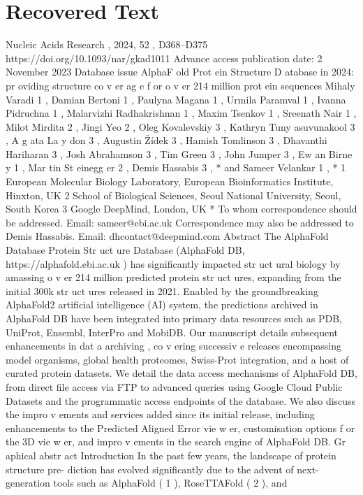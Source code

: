 \section{Recovered Text}
Nucleic Acids Research , 2024, 52 , D368–D375
https://doi.org/10.1093/nar/gkad1011
Advance access publication date: 2 November 2023
Database issue
AlphaF old Prot ein Structure D atabase in 2024: pr oviding
structure co v er ag e f or o v er 214 million prot ein sequences
Mihaly Varadi
1 , Damian Bertoni 1 , Paulyna Magana 1 , Urmila Paramval 1 , Ivanna Pidruchna 1 ,
Malarvizhi Radhakrishnan 1 , Maxim Tsenkov 1 , Sreenath Nair 1 , Milot Mirdita 2 , Jingi Yeo 2 ,
Oleg Kovalevskiy 3 , Kathryn Tuny asuvunakool 3 , A g ata La y don 3 , Augustin Žídek 3 ,
Hamish Tomlinson 3 , Dhavanthi Hariharan 3 , Josh Abrahamson 3 , Tim Green 3 , John Jumper 3 ,
Ew an Birne y
1 , Mar tin St einegg er 2 , Demis Hassabis 3 , * and Sameer Velankar
1 , *
1 European Molecular Biology Laboratory, European Bioinformatics Institute, Hinxton, UK
2 School of Biological Sciences, Seoul National University, Seoul, South Korea
3 Google DeepMind, London, UK
* To whom correspondence should be addressed. Email: sameer@ebi.ac.uk
Correspondence may also be addressed to Demis Hassabis. Email: dhcontact@deepmind.com
Abstract
The AlphaFold Database Protein Str uct ure Database (AlphaFold DB, https://alphafold.ebi.ac.uk ) has significantly impacted str uct ural biology by
amassing o v er 214 million predicted protein str uct ures, expanding from the initial 300k str uct ures released in 2021. Enabled by the groundbreaking
AlphaFold2 artificial intelligence (AI) system, the predictions archived in AlphaFold DB have been integrated into primary data resources such
as PDB, UniProt, Ensembl, InterPro and MobiDB. Our manuscript details subsequent enhancements in dat a archiving , co v ering successiv e
releases encompassing model organisms, global health proteomes, Swiss-Prot integration, and a host of curated protein datasets. We detail
the data access mechanisms of AlphaFold DB, from direct file access via FTP to advanced queries using Google Cloud Public Datasets and
the programmatic access endpoints of the database. We also discuss the impro v ements and services added since its initial release, including
enhancements to the Predicted Aligned Error vie w er, customisation options f or the 3D vie w er, and impro v ements in the search engine of
AlphaFold DB.
Gr aphical abstr act
Introduction
In the past few years, the landscape of protein structure pre-
diction has evolved significantly due to the advent of next-
generation tools such as AlphaFold ( 1 ), RoseTTAFold ( 2 ), and
